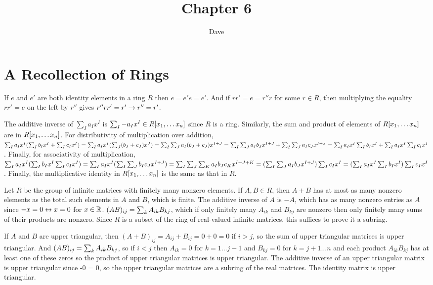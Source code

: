 \documentclass[11pt, oneside]{article}   	%
\title{Chapter 6}
\author{Dave}
\begin{document}
\maketitle
\section{A Recollection of Rings}
\be
\item If $e$ and $e'$ are both identity elements in a ring $R$ then $e = e'e = e'$. And if $rr' = e = r''r$ for some $r \in R$, then multiplying the equality $rr' = e$ on the left by $r''$ gives $r''rr' = r' \rightarrow r'' = r'$.
\item The additive inverse of $\sum_I a_Ix^I$ is $\sum_I -a_Ix^I \in R[x_1, \ldots x_n]$ since $R$ is a ring. Similarly, the sum and product of elements of $R[x_1, \ldots x_n]$ are in $R[x_1, \ldots x_n]$. For distributivity of multiplication over addition, $\sum_I a_Ix^I(\sum_I b_Ix^I + \sum_I c_Ix^I) = \sum_I a_Ix^I(\sum_J(b_J + c_J)x^J) = \sum_I\sum_J a_I(b_J + c_J)x^{I + J} = \sum_I\sum_Ja_Ib_Jx^{I + J} + \sum_I\sum_J a_Ic_Jx^{I + J} = \sum_I a_Ix^I\sum_I b_Ix^I + \sum_I a_Ix^I\sum_I c_Ix^I$. Finally, for associativity of multiplication, $\sum_I a_Ix^I(\sum_I b_Ix^I\sum_I c_Ix^I) = \sum_I a_Ix^I(\sum_I\sum_Jb_Ic_Jx^{I + J}) = \sum_I\sum_J\sum_K a_Ib_Jc_Kx^{I + J + K} = (\sum_I\sum_Ja_Ib_Jx^{I + J})\sum_I c_Ix^I = (\sum_I a_Ix^I\sum_I b_Ix^I)\sum_I c_Ix^I$. Finally, the multiplicative identity in $R[x_1, \ldots x_n]$ is the same as that in $R$.
\item Let $R$ be the group of infinite matrices with finitely many nonzero elements. If $A, B \in R$, then $A + B$ has at most as many nonzero elements as the total such elements in $A$ and $B$, which is finite. The additive inverse of $A$ is $-A$, which has as many nonzero entries as $A$ since $-x = 0 \leftrightarrow x=0$ for $x\in\mathbb{R}$. $(AB)_{ij} = \sum_kA_{ik}B_{kj}$, which if only finitely many $A_{ik}$ and $B_{kj}$ are nonzero then only finitely many sums of their products are nonzero. Since $R$ is a subset of the ring of real-valued infinite matrices, this suffices to prove it a subring.
\item If $A$ and $B$ are upper triangular, then $(A+B)_{ij} = A_{ij} + B_{ij} = 0 + 0 = 0$ if $i  > j$, so the sum of upper triangular matrices is upper triangular. And $(AB)_{ij} = \sum_kA_{ik}B_{kj}$, so if $i < j$ then $A_{ik} = 0$ for $k = 1 \ldots j-1$ and $B_{kj} = 0$ for $k = j+1 \ldots n$ and each product $A_{ik}B_{kj}$ has at least one of these zeros so the product of upper triangular matrices is upper triangular. The additive inverse of an upper triangular matrix is upper triangular since -0 = 0, so the upper triangular matrices are a subring of the real matrices. The identity matrix is upper triangular.
\end{document}
